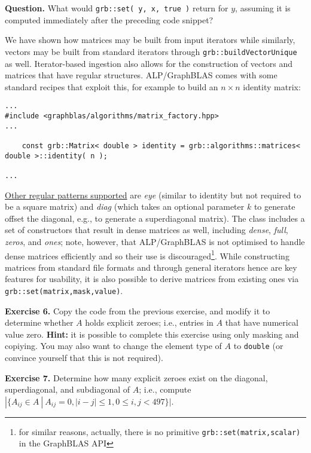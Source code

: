 \noindent \textbf{Question.} What would \texttt{grb::set( y, x, true )} return for $y$, assuming it is computed immediately after the preceding code snippet?

We have shown how matrices may be built from input iterators while similarly, vectors may be built from standard iterators through \texttt{grb::buildVectorUnique} as well. Iterator-based ingestion also allows for the construction of vectors and matrices that have regular structures. ALP/GraphBLAS comes with some standard recipes that exploit this, for example to build an $n\times n$ identity matrix:
\begin{lstlisting}
...
#include <graphblas/algorithms/matrix_factory.hpp>
...

    const grb::Matrix< double > identity = grb::algorithms::matrices< double >::identity( n );

...
\end{lstlisting}
\href{http://albert-jan.yzelman.net/alp/v0.8-preview/classgrb_1_1algorithms_1_1matrices.html#a1336accbaf6a61ebd890bef9da4116fc}{Other regular patterns supported} are \emph{eye} (similar to identity but not required to be a square matrix) and \emph{diag} (which takes an optional parameter $k$ to generate offset the diagonal, e.g., to generate a superdiagonal matrix). The class includes a set of constructors that result in dense matrices as well, including \emph{dense}, \emph{full}, \emph{zeros}, and \emph{ones}; note, however, that ALP/GraphBLAS is not optimised to handle dense matrices efficiently and so their use is discouraged\footnote{for similar reasons, actually, there is no primitive \texttt{grb::set(matrix,scalar)} in the GraphBLAS API}. While constructing matrices from standard file formats and through general iterators hence are key features for usability, it is also possible to derive matrices from existing ones via \texttt{grb::set(matrix,mask,value)}.

\noindent \textbf{Exercise 6.} Copy the code from the previous exercise, and modify it to determine whether $A$ holds explicit zeroes; i.e., entries in $A$ that have numerical value zero. \textbf{Hint:} it is possible to complete this exercise using only masking and copiying. You may also want to change the element type of $A$ to \texttt{double} (or convince yourself that this is not required).

\noindent \textbf{Exercise 7.} Determine how many explicit zeroes exist on the diagonal, superdiagonal, and subdiagonal of $A$; i.e., compute $|\{A_{ij}\in A\ |\ A_{ij}=0, |i-j|\leq1, 0\leq i,j<497\}|$.

